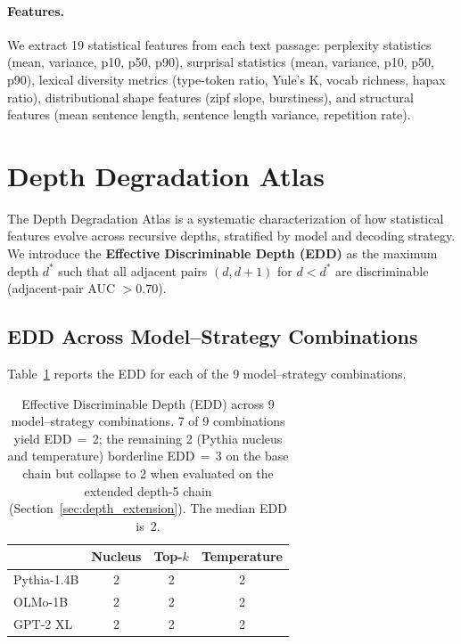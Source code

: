\documentclass[11pt,a4paper]{article}
\begin{document}
\paragraph{Features.} We extract 19 statistical features from each text passage: perplexity statistics (mean, variance, p10, p50, p90), surprisal statistics (mean, variance, p10, p50, p90), lexical diversity metrics (type-token ratio, Yule's K, vocab richness, hapax ratio), distributional shape features (zipf slope, burstiness), and structural features (mean sentence length, sentence length variance, repetition rate).

\section{Depth Degradation Atlas}
\label{sec:atlas}

The Depth Degradation Atlas is a systematic characterization of how statistical features evolve across recursive depths, stratified by model and decoding strategy.
We introduce the \textbf{Effective Discriminable Depth (EDD)} as the maximum depth $d^*$ such that all adjacent pairs $(d, d+1)$ for $d < d^*$ are discriminable (adjacent-pair AUC $> 0.70$).

\subsection{EDD Across Model--Strategy Combinations}

Table~\ref{tab:edd_matrix} reports the EDD for each of the 9 model--strategy combinations.

\begin{table}[t]
\centering
\small
\begin{tabular}{lccc}
\toprule
 & \textbf{Nucleus} & \textbf{Top-$k$} & \textbf{Temperature} \\
\midrule
Pythia-1.4B & 2 & 2 & 2 \\
OLMo-1B & 2 & 2 & 2 \\
GPT-2 XL & 2 & 2 & 2 \\
\bottomrule
\end{tabular}
\caption{Effective Discriminable Depth (EDD) across 9 model--strategy combinations. 7 of 9 combinations yield EDD\,$=$\,2; the remaining 2 (Pythia nucleus and temperature) borderline EDD\,$=$\,3 on the base chain but collapse to 2 when evaluated on the extended depth-5 chain (Section~\ref{sec:depth_extension}). The median EDD is~2.}
\label{tab:edd_matrix}
\end{table}
\end{document}
